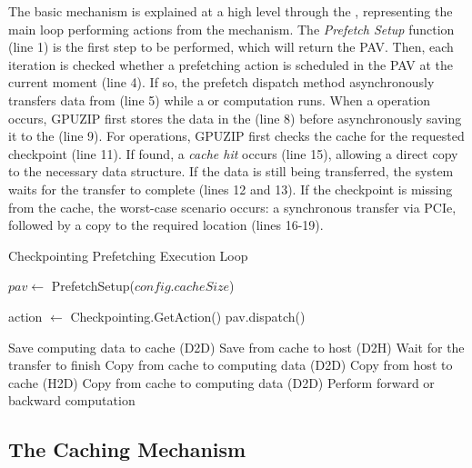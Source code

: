 \documentclass[Ingles,Final]{ic-tese-v3}
\begin{document}
The basic \checkpointprefetching mechanism is explained at a high level through the , representing the \awave main loop performing actions from the \checkpointprefetching mechanism. The \textit{Prefetch Setup} function (line 1) is the first step to be performed, which will return the PAV. Then, each iteration is checked whether a prefetching action is scheduled in the PAV at the current moment (line 4). If so, the prefetch dispatch method asynchronously transfers data from \htd (line 5) while a \fwd or \bwd computation runs. When a \save operation occurs, GPUZIP first stores the data in the \cache (line 8) before asynchronously saving it to the \pool (line 9). For \restore operations, GPUZIP first checks the cache for the requested checkpoint (line 11). If found, a \textit{cache hit} occurs (line 15), allowing a direct \dtd copy to the necessary data structure. If the data is still being transferred, the system waits for the transfer to complete (lines 12 and 13). If the checkpoint is missing from the cache, the worst-case scenario occurs: a synchronous \htd transfer via PCIe, followed by a \dtd copy to the required location (lines 16-19).

\begin{algorithm}[h!]
\caption{Checkpointing Prefetching Execution Loop}
\label{alg:prefetching_loop}
\begin{algorithmic}[1]
\STATE $pav \gets$ PrefetchSetup($config.cacheSize$)

    \STATE action $\gets$ Checkpointing.GetAction()
        \STATE pav.dispatch()
    \ENDIF
    
        \STATE Save computing data to cache (D2D)
        \STATE Save from cache to host (D2H)
                \STATE Wait for the transfer to finish
            \ENDIF
            \STATE Copy from cache to computing data (D2D)
        \ELSE
            \STATE Copy from host to cache (H2D)
            \STATE Copy from cache to computing data (D2D)
        \ENDIF
        \STATE Perform forward or backward computation
    \ENDIF
\ENDWHILE
\end{algorithmic}
\end{algorithm}


\subsection{The Caching Mechanism}
\label{sec:caching}
\end{document}
